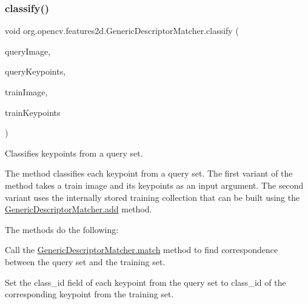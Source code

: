 \subsubsection{\texorpdfstring{classify()}{classify()}\hspace{0.1cm}{\footnotesize\ttfamily [1/2]}}
{\footnotesize\ttfamily void org.\+opencv.\+features2d.\+Generic\+Descriptor\+Matcher.\+classify (\begin{DoxyParamCaption}\item[{\mbox{\hyperlink{classorg_1_1opencv_1_1core_1_1_mat}{Mat}}}]{query\+Image,  }\item[{\mbox{\hyperlink{classorg_1_1opencv_1_1core_1_1_mat_of_key_point}{Mat\+Of\+Key\+Point}}}]{query\+Keypoints,  }\item[{\mbox{\hyperlink{classorg_1_1opencv_1_1core_1_1_mat}{Mat}}}]{train\+Image,  }\item[{\mbox{\hyperlink{classorg_1_1opencv_1_1core_1_1_mat_of_key_point}{Mat\+Of\+Key\+Point}}}]{train\+Keypoints }\end{DoxyParamCaption})}

Classifies keypoints from a query set.

The method classifies each keypoint from a query set. The first variant of the method takes a train image and its keypoints as an input argument. The second variant uses the internally stored training collection that can be built using the {\ttfamily \mbox{\hyperlink{classorg_1_1opencv_1_1features2d_1_1_generic_descriptor_matcher_ad0e0a234636c370c74fdd4086ac5c716}{Generic\+Descriptor\+Matcher.\+add}}} method.

The methods do the following\+:


\begin{DoxyItemize}
\item Call the {\ttfamily \mbox{\hyperlink{classorg_1_1opencv_1_1features2d_1_1_generic_descriptor_matcher_ab02d6f8f1fa4c188b431bc6fcc5a4cac}{Generic\+Descriptor\+Matcher.\+match}}} method to find correspondence between the query set and the training set. 
\item Set the {\ttfamily class\+\_\+id} field of each keypoint from the query set to {\ttfamily class\+\_\+id} of the corresponding keypoint from the training set. 
\end{DoxyItemize}


